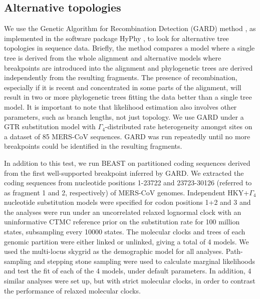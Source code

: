 \documentclass[11pt,oneside,letterpaper]{article}
\begin{document}
\subsection*{Alternative topologies}
We use the Genetic Algorithm for Recombination Detection (GARD) method \citep{pond_2006}, as implemented in the software package HyPhy \citep{pond_2005}, to look for alternative tree topologies in sequence data.
Briefly, the method compares a model where a single tree is derived from the whole alignment and alternative models where breakpoints are introduced into the alignment and phylogenetic trees are derived independently from the resulting fragments.
The presence of recombination, especially if it is recent and concentrated in some parts of the alignment, will result in two or more phylogenetic trees fitting the data better than a single tree model.
It is important to note that likelihood estimation also involves other parameters, such as branch lengths, not just topology.
We use GARD under a GTR \citep{tavare_1986} substitution model with $\Gamma_{4}$-distributed rate heterogeneity amongst sites \citep{yang_1994} on a dataset of 85 MERS-CoV sequences.
GARD was run repeatedly until no more breakpoints could be identified in the resulting fragments.

In addition to this test, we run BEAST \citep{drummond_2012} on partitioned coding sequences derived from the first well-supported breakpoint inferred by GARD.
We extracted the coding sequences from nucleotide positions 1-23722 and 23723-30126 (referred to as fragment 1 and 2, respectively) of MERS-CoV genomes.
Independent HKY+$\Gamma_{4}$ \citep{hky_1985,yang_1994} nucleotide substitution models were specified for codon positions 1+2 and 3 and the analyses were run under an uncorrelated relaxed lognormal clock with an uninformative CTMC reference prior \citep{ferreira_2008} on the substitution rate for 100 million states, subsampling every 10000 states.
The molecular clocks and trees of each genomic partition were either linked or unlinked, giving a total of 4 models.
We used the multi-locus skygrid \citep{gill_2013} as the demographic model for all analyses.
Path-sampling and stepping stone sampling \citep{baele_2012} were used to calculate marginal likelihoods and test the fit of each of the 4 models, under default parameters.
In addition, 4 similar analyses were set up, but with strict molecular clocks, in order to contrast the performance of relaxed molecular clocks.
\end{document}
